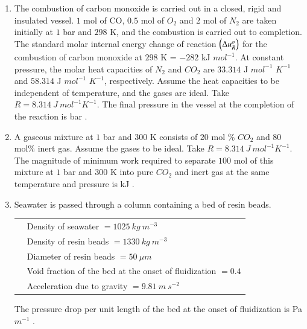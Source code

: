 \documentclass[journal,12pt,onecolumn]{IEEEtran}
\theoremstyle{remark}
\begin{document}
\begin{enumerate}
 

\item The combustion of carbon monoxide is carried out in a closed, rigid and insulated vessel. $1$ mol of CO, $0.5$ mol of $O_{2}$ and $2$ mol of $N_{2}$ are taken initially at $1$ bar and $298$ K, and the combustion is carried out to completion. The standard molar internal energy change of reaction $\left(\Delta u_{R}^{o}\right)$ for the combustion of carbon monoxide at $298$ K = $-282$ kJ $mol^{-1}$. At constant pressure, the molar heat capacities of $N_{2}$ and $CO_{2}$ are $33.314$ J $mol^{-1}$ $K^{-1}$ and $58.314$ J $mol^{-1}$ $K^{-1}$, respectively. Assume the heat capacities to be independent of temperature, and the gases are ideal. Take $R = 8.314~J~mol^{-1}K^{-1}$. The final pressure in the vessel at the completion of the reaction is \underline{\hspace{2cm}} bar .
\hfill{}

 

\item A gaseous mixture at $1$ bar and $300$ K consists of $20$ mol \% $CO_{2}$ and $80$ mol\% inert gas. Assume the gases to be ideal. Take $R=8.314~J~mol^{-1}K^{-1}$. The magnitude of minimum work required to separate $100$ mol of this mixture at $1$ bar and $300$ K into pure $CO_{2}$ and inert gas at the same temperature and pressure is \underline{\hspace{2cm}} kJ .
\hfill{}

 

\item Seawater is passed through a column containing a bed of resin beads.
\begin{tabularx}{\textwidth}{lX}
& Density of seawater $=1025~kg~m^{-3}$ \\
& Density of resin beads $=1330~kg~m^{-3}$ \\
& Diameter of resin beads $=50~\mu m$ \\
& Void fraction of the bed at the onset of fluidization $=0.4$ \\
& Acceleration due to gravity $=9.81~m~s^{-2}$ \\
\end{tabularx}
The pressure drop per unit length of the bed at the onset of fluidization is \underline{\hspace{2cm}} Pa $m^{-1}$ .
\hfill{}


\end{enumerate}
\end{document}
